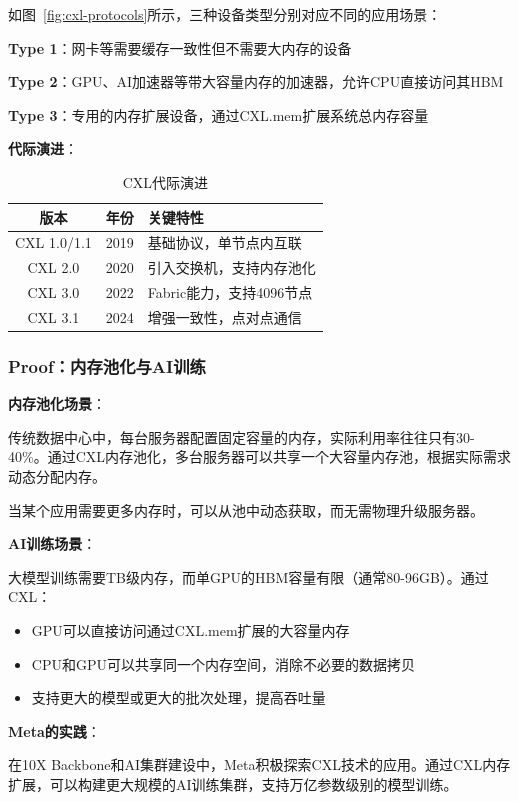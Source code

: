 如图~\ref{fig:cxl-protocols}所示，三种设备类型分别对应不同的应用场景：

\textbf{Type 1}：网卡等需要缓存一致性但不需要大内存的设备

\textbf{Type 2}：GPU、AI加速器等带大容量内存的加速器，允许CPU直接访问其HBM

\textbf{Type 3}：专用的内存扩展设备，通过CXL.mem扩展系统总内存容量

\textbf{代际演进}：

\begin{table}[h]
\centering
\caption{CXL代际演进}
\begin{tabular}{cll}
\toprule
\textbf{版本} & \textbf{年份} & \textbf{关键特性} \\
\midrule
CXL 1.0/1.1 & 2019 & 基础协议，单节点内互联 \\
CXL 2.0 & 2020 & 引入交换机，支持内存池化 \\
CXL 3.0 & 2022 & Fabric能力，支持4096节点 \\
CXL 3.1 & 2024 & 增强一致性，点对点通信 \\
\bottomrule
\end{tabular}
\end{table}

\subsubsection{Proof：内存池化与AI训练}

\textbf{内存池化场景}：

传统数据中心中，每台服务器配置固定容量的内存，实际利用率往往只有30-40\%。通过CXL内存池化，多台服务器可以共享一个大容量内存池，根据实际需求动态分配内存。

当某个应用需要更多内存时，可以从池中动态获取，而无需物理升级服务器。

\textbf{AI训练场景}：

大模型训练需要TB级内存，而单GPU的HBM容量有限（通常80-96GB）。通过CXL：
\begin{itemize}
    \item GPU可以直接访问通过CXL.mem扩展的大容量内存
    \item CPU和GPU可以共享同一个内存空间，消除不必要的数据拷贝
    \item 支持更大的模型或更大的批次处理，提高吞吐量
\end{itemize}

\textbf{Meta的实践}：

在10X Backbone和AI集群建设中，Meta积极探索CXL技术的应用。通过CXL内存扩展，可以构建更大规模的AI训练集群，支持万亿参数级别的模型训练。

